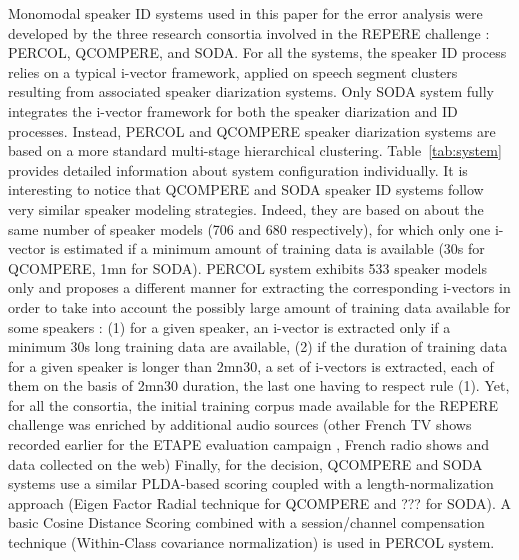 Monomodal speaker ID systems used in this paper for the error analysis were developed by the three research consortia involved in the REPERE challenge : PERCOL, QCOMPERE, and SODA. For all the systems, the speaker ID process relies on a typical i-vector framework, applied on speech segment clusters resulting from associated speaker diarization systems. Only SODA system  \cite{dupuy2014}  fully integrates the i-vector framework for both the speaker diarization and ID processes. Instead, PERCOL and QCOMPERE speaker diarization systems \cite{Barras2006,charlet2013} are based on a more standard multi-stage hierarchical clustering. Table~\ref{tab:system} provides detailed information about system configuration individually. It is interesting to notice that QCOMPERE and SODA speaker ID systems follow very similar speaker modeling strategies. Indeed, they are based on about the same number of speaker models (706 and 680 respectively), for which only one i-vector is estimated if a minimum amount of training data is available (30s for QCOMPERE, 1mn for SODA).  PERCOL system exhibits 533 speaker models only and proposes a different manner for extracting the corresponding i-vectors in order to take into account the possibly large amount of training data available for some speakers :  (1) for a given speaker, an i-vector is extracted only if a minimum 30s long training data are available, (2) if the duration of training data for a given speaker is longer than 2mn30, a set of i-vectors is extracted, each of them on the basis of 2mn30 duration, the last one having to respect rule (1). Yet, for all the consortia, the initial training corpus made available for the REPERE challenge was enriched by additional audio sources (other French TV shows recorded earlier for the ETAPE evaluation campaign \cite{gravier2012}, French radio shows and data collected on the web)  
Finally, for the decision, QCOMPERE and SODA systems use a similar PLDA-based scoring coupled with a length-normalization approach (Eigen Factor Radial technique for QCOMPERE and ??? for SODA). A basic Cosine Distance Scoring combined with a session/channel compensation technique (Within-Class covariance normalization)  is used in PERCOL system.


